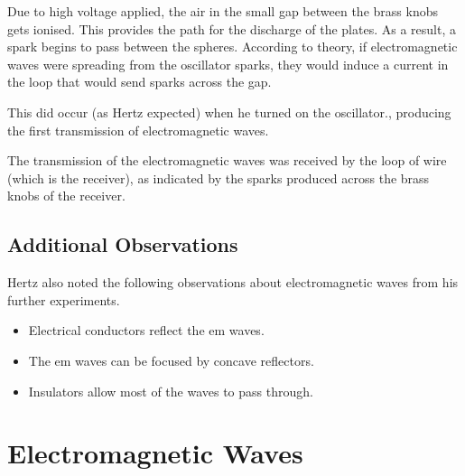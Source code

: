 \documentclass[a4paper,12pt]{BYUTextbook}
\begin{document}
			Due to high voltage applied, the air in the small gap between the brass knobs gets ionised. This provides the path for the discharge of the plates. As a result, a spark begins to pass between the spheres. According to theory, if electromagnetic waves were spreading from the oscillator sparks, they would induce a current in the loop that would send sparks across the gap. 
			
			This did occur (as Hertz expected) when he turned on the oscillator., producing the first transmission of electromagnetic waves.
			
			The transmission of the electromagnetic waves was received by the loop of wire (which is the receiver), as indicated by the sparks produced across the brass knobs of the receiver.
			
			\subsection{Additional Observations}
			
			Hertz also noted the following observations about electromagnetic waves from his further experiments.
			
			\begin{itemize}
				\item Electrical conductors reflect the em waves. 
				\item The em waves can be focused by concave reflectors. 
				\item Insulators allow most of the waves to pass through.
			\end{itemize}
		
		\section{Electromagnetic Waves}
		
\end{document}
